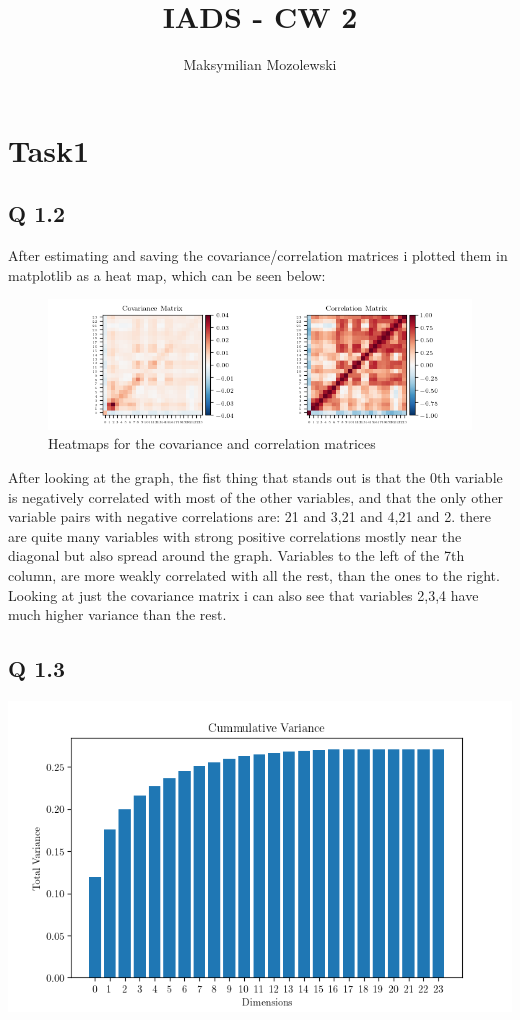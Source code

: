 \documentclass{report}
\begin{document}
\title{IADS - CW 2}
\author{Maksymilian Mozolewski}
\maketitle
\pagebreak
\section{Task1}

\subsection*{Q 1.2}
After estimating and saving the covariance/correlation matrices i plotted them in matplotlib as a heat map, which can be seen below:
\begin{figure}[h]
    \includegraphics[scale=1,left]{Years/Year2/Semester2/Learning/CW/python_code/correlation.png} 
    \caption{Heatmaps for the covariance and correlation matrices}
\end{figure}
After looking at the graph, the fist thing that stands out is that the 0th variable is negatively correlated with most of the other variables, and that the only other variable pairs with negative correlations are: 21 and 3,21 and 4,21 and 2. there are quite many variables with strong positive correlations mostly near the diagonal but also spread around the graph. Variables to the left of the 7th column, are more weakly correlated with all the rest, than the ones to the right. Looking at just the covariance matrix i can also see that variables 2,3,4 have much higher variance than the rest.
\subsection*{Q 1.3}
\includegraphics{Years/Year2/Semester2/Learning/CW/python_code/cumvar.png}
\end{document}
